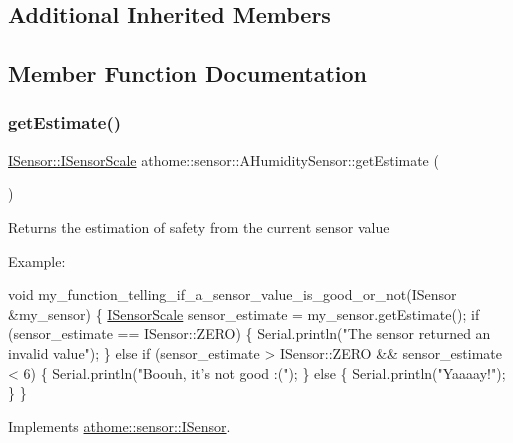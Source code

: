 \subsection*{Additional Inherited Members}


\subsection{Member Function Documentation}
\mbox{\label{classathome_1_1sensor_1_1_a_humidity_sensor_a1da82433989c79066ce32d5606f4f675}} 
\subsubsection{\texorpdfstring{get\+Estimate()}{getEstimate()}}
{\footnotesize\ttfamily \mbox{\hyperlink{classathome_1_1sensor_1_1_i_sensor_aa70bc27a4c17c86caf96cca776541ddf}{I\+Sensor\+::\+I\+Sensor\+Scale}} athome\+::sensor\+::\+A\+Humidity\+Sensor\+::get\+Estimate (\begin{DoxyParamCaption}{ }\end{DoxyParamCaption})\hspace{0.3cm}{\ttfamily [virtual]}}

Returns the estimation of safety from the current sensor value

Example\+:


\begin{DoxyCode}
\textcolor{keywordtype}{void} my\_function\_telling\_if\_a\_sensor\_value\_is\_good\_or\_not(ISensor &my\_sensor) \{
  \mbox{\hyperlink{classathome_1_1sensor_1_1_i_sensor_aa70bc27a4c17c86caf96cca776541ddf}{ISensorScale}} sensor\_estimate = my\_sensor.getEstimate();
  \textcolor{keywordflow}{if} (sensor\_estimate == ISensor::ZERO) \{
    Serial.println(\textcolor{stringliteral}{"The sensor returned an invalid value"});
  \}
  \textcolor{keywordflow}{else} \textcolor{keywordflow}{if} (sensor\_estimate > ISensor::ZERO && sensor\_estimate < 6) \{
    Serial.println(\textcolor{stringliteral}{"Boouh, it's not good :("});
  \}
  \textcolor{keywordflow}{else} \{
    Serial.println(\textcolor{stringliteral}{"Yaaaay!"});
  \}
\}
\end{DoxyCode}
 

Implements \mbox{\hyperlink{classathome_1_1sensor_1_1_i_sensor_a95785b54ffe3a8f7e48c81b5732e3b9f}{athome\+::sensor\+::\+I\+Sensor}}.

